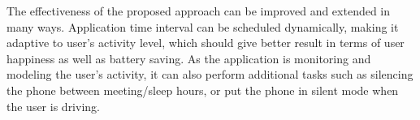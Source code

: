 The effectiveness of the proposed approach can be improved and extended in many ways. Application time interval
can be scheduled dynamically, making it adaptive to user's activity level, which should give better result in terms of user happiness
as well as battery saving. As the application is monitoring and modeling the user's activity, it can also perform additional tasks
such as silencing the phone between meeting/sleep hours, or put the phone in silent mode when the user is driving.
